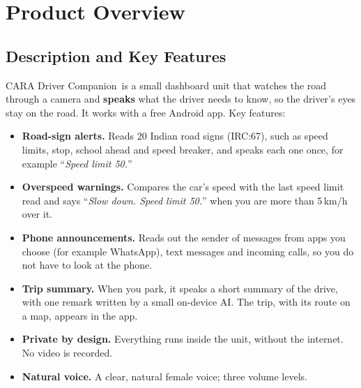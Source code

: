 \documentclass[11pt,a4paper,oneside]{report}
\newcommand{\say}[1]{``\textit{#1}''}
\newcommand{\ProductName}{CARA Driver Companion}
\begin{document}
\chapter{Product Overview}\label{ch:overview}
\section{Description and Key Features}
\ProductName\ is a small dashboard unit that watches the road through a camera and \textbf{speaks} what the driver needs to know, so the driver's eyes stay on the road. It works with a free Android app. Key features:
\begin{itemize}[leftmargin=*]
\item \textbf{Road-sign alerts.} Reads 20 Indian road signs (IRC:67), such as speed limits, stop, school ahead and speed breaker, and speaks each one once, for example \say{Speed limit 50.}
\item \textbf{Overspeed warnings.} Compares the car's speed with the last speed limit read and says \say{Slow down. Speed limit 50.} when you are more than 5\,km/h over it.
\item \textbf{Phone announcements.} Reads out the sender of messages from apps you choose (for example WhatsApp), text messages and incoming calls, so you do not have to look at the phone.
\item \textbf{Trip summary.} When you park, it speaks a short summary of the drive, with one remark written by a small on-device AI. The trip, with its route on a map, appears in the app.
\item \textbf{Private by design.} Everything runs inside the unit, without the internet. No video is recorded.
\item \textbf{Natural voice.} A clear, natural female voice; three volume levels.
\end{itemize}
\end{document}
